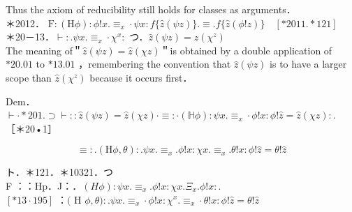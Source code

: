 \documentclass[10pt]{article}
\begin{document}
Thus the axiom of reducibility still holds for classes as arguments．\\
＊2012． $\mathrm{F}:(\mathrm{H} \phi): \phi!x . \equiv_{x} \cdot \psi x: f\{\hat{z}(\psi z)\} . \equiv . f\{\hat{z}(\phi!z)\} \quad[* 2011 . * 121]$\\
＊20－13．$\vdash: . \psi x . \equiv_{x} \cdot \chi^{x}:$ つ．$\hat{z}(\psi z)=\hat{z}\left(\chi^{z}\right)$\\
The meaning of＂$\hat{z}(\psi z)=\hat{z}(\chi z)$＂is obtained by a double application of $* 20.01$ to $* 13.01$ ，remembering the convention that $\hat{z}(\psi z)$ is to have a larger scope than $\hat{z}\left(\chi^{z}\right)$ because it occurs first．

Dem．\\
$\vdash \cdot * 201 . \supset \vdash:: \hat{z}(\psi z)=\hat{z}(\chi z) \cdot \equiv: \cdot(\mathbb{H} \phi): \psi x . \equiv_{x} \cdot \phi!x: \phi!\hat{z}=\hat{z}(\chi z):$.\\
［＊20•1］


\begin{equation*}
\equiv: .(\mathrm{H} \phi, \theta): . \psi x . \equiv_{x} . \phi!x: \chi x . \equiv_{x} . \theta!x: \phi!\hat{z}=\theta!\hat{z} \tag{1}
\end{equation*}


ト．＊121．＊10321．つ\\
F ：：Hp．J：．$(H \phi): \psi x . \equiv_{x} . \phi!x: \chi x . \Xi_{x} . \phi!x:$.\\
$[* 13 \cdot 195]$ ：$($ H $\phi, \theta): . \psi x . \equiv_{x} \cdot \phi!x: \chi^{x} . \equiv_{x} \cdot \theta!x: \phi!\hat{z}=\theta!\hat{z}$
\end{document}
